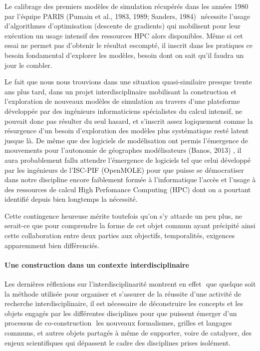 Le calibrage  des premiers modèles de simulation récupérés dans les années 1980 par l'équipe PARIS (Pumain et al., 1983, 1989; Sanders, 1984)%
⁠ nécessite l'usage d'algorithmes d'optimisation (descente de gradients) qui mobilisent pour leur exécution un usage intensif des ressources HPC alors disponibles. Même si cet essai ne permet pas d'obtenir le résultat escompté, il inscrit dans les pratiques ce besoin fondamental d'explorer les modèles, besoin dont on sait qu'il faudra un jour le combler. 

Le fait que nous nous trouvions dans une situation quasi-similaire presque trente ans plus tard, dans un projet interdisciplinaire mobilisant la construction et l'exploration de nouveaux modèles de simulation au travers d'une plateforme développée par des ingénieurs informaticiens spécialistes du calcul intensif, ne pouvait donc pas résulter du seul hasard, et s'inscrit assez logiquement comme la résurgence d'un besoin d'exploration des modèles plus systématique resté latent jusque là. De même que des logiciels de modélisation ont permis l'émergence de mouvements pour l'autonomie de géographes modélisateurs (Banos, 2013)%
⁠, il aura probablement fallu attendre l'émergence de logiciels tel que celui développé par les ingénieurs de l'ISC-PIF (OpenMOLE) pour que puisse se démocratiser dans notre discipline encore faiblement formée à l'informatique l'accès et l'usage à des ressources de calcul High Perfomance Computing (HPC) dont on a pourtant identifié depuis bien longtemps la nécessité. 

Cette contingence heureuse mérite toutefois qu'on s'y attarde un peu plus, ne serait-ce que pour comprendre la forme de cet objet commun ayant précipité ainsi cette collaboration entre deux parties aux objectifs, temporalités, exigences apparemment bien différenciés. 

\paragraph*{Une construction dans un contexte interdisciplinaire}

Les dernières réflexions sur l'interdisciplinarité montrent en effet \autocites{Pumain2005, Chapron2014}⁠ que quelque soit la méthode utilisée pour organiser et s'assurer de la réussite d'une activité de recherche interdisciplinaire, il est nécessaire de déconstruire les concepts et les objets engagés par les différentes disciplines pour que puissent émerger d'un processus de co-construction \autocite{Banos2013}⁠ les nouveaux formalismes, grilles et langages communs, et autres objets partagés à même de supporter, voire de catalyser, des enjeux scientifiques qui dépassent le cadre des disciplines prises isolément.

